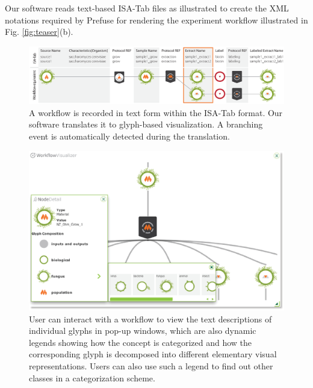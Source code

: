 Our software reads text-based ISA-Tab files as illustrated to create the XML notations required by Prefuse for rendering the experiment workflow illustrated in Fig. \ref{fig:teaser}(b).

\begin{figure}[t!]
\centering
\includegraphics[scale=.2745]{images/glyph-taxonomy/generating-workflow-from-text.eps}
\caption{A workflow is recorded in text form within the ISA-Tab format.
Our software translates it to glyph-based visualization.
A branching event is automatically detected during the translation.}
\label{fig:generating-workflow-from-text}
\vspace{-10pt}
\end{figure}

\begin{figure}[ht!]
\centering
\includegraphics[scale=.295]{images/glyph-taxonomy/bio-workflow-example.eps}
\caption{User can interact with a workflow to view the text descriptions of individual glyphs in pop-up windows, which are also dynamic legends showing how the concept is categorized and how the corresponding glyph is decomposed into different elementary visual representations. Users can also use such a legend to find out other classes in a categorization scheme.}
\label{fig:bioworkflow-example}
\vspace{-15pt}
\end{figure}

